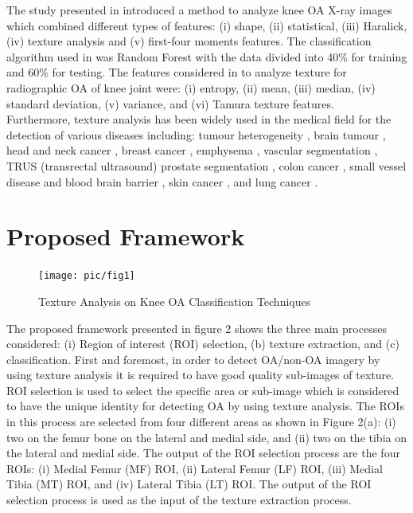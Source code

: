 \documentclass[review]{elsarticle}
\begin{document}
The study presented in \cite{S.2016} introduced a method to analyze knee OA X-ray images which combined different types of features: (i) shape, (ii) statistical, (iii) Haralick, (iv) texture analysis and (v) first-four moments features. The classification algorithm used in \cite{S.2016} was Random Forest with the data divided into 40\% for training and 60\% for testing. The features considered in \cite{Kawathekar2015} to analyze texture for radiographic OA of knee joint were: (i) entropy, (ii) mean, (iii) median, (iv) standard deviation, (v) variance, and (vi) Tamura texture features. \\

Furthermore, texture analysis has been widely used in the medical field for the detection of various diseases including: tumour heterogeneity \cite{Liu2017, Miles2013}, brain tumour \cite{Weltens2001}, head and neck cancer \cite{Yu2009}, breast cancer \cite{Zhou2007}, emphysema \cite{Xu2006,Vasconcelos}, vascular segmentation \cite{PoddaB.2005, Ahmed2013}, TRUS (transrectal ultrasound) prostate segmentation \cite{Yuan2013, Kachouie2007}, colon cancer \cite{Esgiar2002}, small vessel disease and blood brain barrier \cite{ValdesHernandez2017}, skin cancer \cite{Ntroduction2014}, and lung cancer \cite{Pham2017}.
\section{Proposed Framework }


\begin{figure}[h!]
	\centering
	\texttt{[image: pic/fig1]}
	\caption{Texture Analysis on Knee OA Classification Techniques}
	\label{fig:fig1}
\end{figure}
The proposed framework presented in figure 2 shows the three main processes considered: (i) Region of interest (ROI) selection, (b) texture extraction, and (c) classification. First and foremost, in order to detect OA/non-OA imagery by using texture analysis it is required to have good quality sub-images of texture. ROI selection is used to select the specific area or sub-image which is considered to have the unique identity for detecting OA by using texture analysis. The ROIs in this process are selected from four different areas as shown in Figure 2(a): (i) two on the femur bone on the lateral and medial side, and (ii) two on the tibia on the lateral and medial side. The output of the ROI selection process are the four ROIs: (i) Medial Femur (MF) ROI, (ii) Lateral Femur (LF) ROI, (iii) Medial Tibia (MT) ROI, and (iv) Lateral Tibia (LT) ROI. The output of the ROI selection process is used as the input of the texture extraction process. \\
\end{document}
